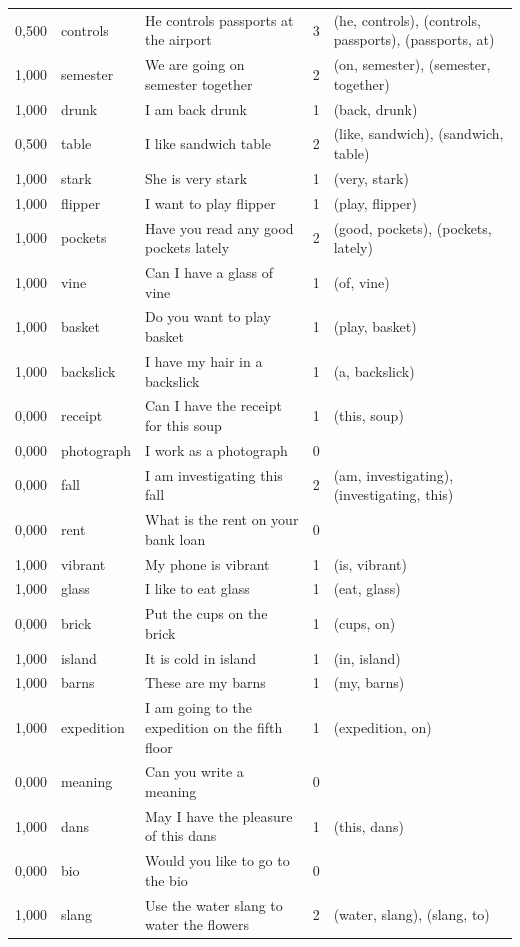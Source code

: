 \documentclass[a4paper,12pt]{article}
\begin{document}
\begin{landscape}
\begin{longtable}{l l l r l}
0,500 & controls & He controls passports at the airport & 3 & (he, controls), (controls, passports), (passports, at) \\
1,000 & semester & We are going on semester together & 2 & (on, semester), (semester, together) \\
1,000 & drunk & I am back drunk & 1 & (back, drunk) \\
0,500 & table & I like sandwich table & 2 & (like, sandwich), (sandwich, table) \\
1,000 & stark & She is very stark & 1 & (very, stark) \\
1,000 & flipper & I want to play flipper & 1 & (play, flipper) \\
1,000 & pockets & Have you read any good pockets lately & 2 & (good, pockets), (pockets, lately) \\
1,000 & vine & Can I have a glass of vine & 1 & (of, vine) \\
1,000 & basket & Do you want to play basket & 1 & (play, basket) \\
1,000 & backslick & I have my hair in a backslick & 1 & (a, backslick) \\
0,000 & receipt & Can I have the receipt for this soup & 1 & (this, soup) \\
0,000 & photograph & I work as a photograph & 0 &  \\
0,000 & fall & I am investigating this fall & 2 & (am, investigating), (investigating, this) \\
0,000 & rent & What is the rent on your bank loan & 0 &  \\
1,000 & vibrant & My phone is vibrant & 1 & (is, vibrant) \\
1,000 & glass & I like to eat glass & 1 & (eat, glass) \\
0,000 & brick & Put the cups on the brick & 1 & (cups, on) \\
1,000 & island & It is cold in island & 1 & (in, island) \\
1,000 & barns & These are my barns & 1 & (my, barns) \\
1,000 & expedition & I am going to the expedition on the fifth floor & 1 & (expedition, on) \\
0,000 & meaning & Can you write a meaning & 0 &  \\
1,000 & dans & May I have the pleasure of this dans & 1 & (this, dans) \\
0,000 & bio & Would you like to go to the bio & 0 &  \\
1,000 & slang & Use the water slang to water the flowers & 2 & (water, slang), (slang, to) \\

\end{longtable}
\end{landscape}
\end{document}
